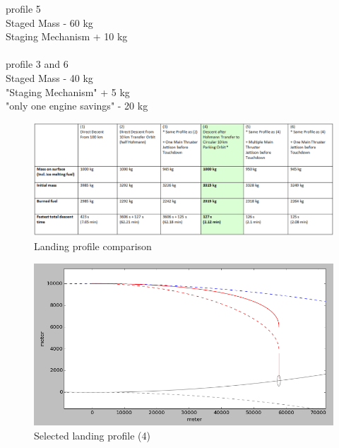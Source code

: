 profile 5\\
Staged Mass  - 60 kg\\
Staging Mechanism + 10 kg\\
\\
profile 3 and 6\\
Staged Mass  - 40 kg\\
"Staging Mechanism" + 5 kg \\
"only one engine savings" - 20 kg



\begin{figure}[htb]
	\centering
	\includegraphics[width=\textwidth]{Lander/aaroncomparison}
	\caption{Landing profile comparison\label{fig:acomparison}}
\end{figure}


\begin{figure}[htb]
	\centering
	\includegraphics[width=\textwidth]{Lander/aaronlandingprofile}
	\caption{Selected landing profile (4)\label{fig:alandingprofile}}
\end{figure}



